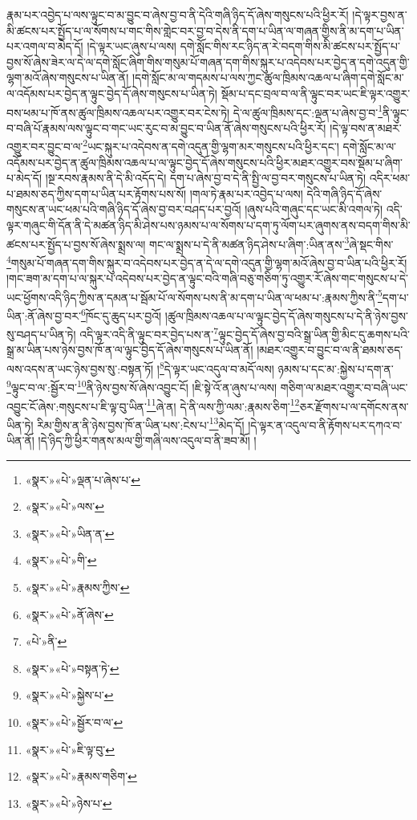 རྣམ་པར་འབྱེད་པ་ལས་ལྟུང་བ་མ་བྱུང་བ་ཞེས་བྱ་བ་ནི་དེའི་གཞི་ཉིད་དོ་ཞེས་གསུངས་པའི་ཕྱིར་རོ། །དེ་ལྟར་བྱས་ན་མི་ཚངས་པར་སྤྱོད་པ་ལ་སོགས་པ་གང་གིས་གླེང་བར་བྱ་བ་དེས་ནི་དག་པ་ཡིན་ལ་གཞན་གྱིས་ནི་མ་དག་པ་ཡིན་པར་འགལ་བ་མེད་དོ། །དེ་ལྟར་ཡང་ཞུས་པ་ལས། དགེ་སློང་གིས་རང་ཉིད་ན་རེ་བདག་གིས་མི་ཚངས་པར་སྤྱོད་པ་བྱས་སོ་ཞེས་ཟེར་ལ་དེ་ལ་དགེ་སློང་ཞིག་གིས་གསུམ་པོ་གཞན་དག་གིས་སྐུར་པ་འདེབས་པར་བྱེད་ན་དགེ་འདུན་གྱི་ལྷག་མའོ་ཞེས་གསུངས་པ་ཡིན་ནོ། །དགེ་སློང་མ་ལ་གདམས་པ་ལས་ཀྱང་ཚུལ་ཁྲིམས་འཆལ་པ་ཞིག་དགེ་སློང་མ་ལ་འདོམས་པར་བྱེད་ན་ལྟུང་བྱེད་དོ་ཞེས་གསུངས་པ་ཡིན་ཏེ། སྡོམ་པ་དང་བྲལ་བ་ལ་ནི་ལྟུང་བར་ཡང་ཇི་ལྟར་འགྱུར་བས་ཕམ་པ་ཁོ་ནས་ཚུལ་ཁྲིམས་འཆལ་པར་འགྱུར་བར་ངེས་ཏེ། དེ་ལ་ཚུལ་ཁྲིམས་དང་:ལྡན་པ་ཞེས་བྱ་བ་\footnote{«སྣར་»«པེ་»ལྡན་པ་ཞེས་པ་}ནི་ལྟུང་བ་བཞི་པོ་རྣམས་ལས་ལྟུང་བ་གང་ཡང་རུང་བ་མ་བྱུང་བ་ཡིན་ནོ་ཞེས་གསུངས་པའི་ཕྱིར་རོ། །དེ་ལྟ་བས་ན་མཐར་འགྱུར་བར་བྱུང་བ་ལ་\footnote{«སྣར་»«པེ་»ལས་}ཡང་སྐུར་པ་འདེབས་ན་དགེ་འདུན་གྱི་ལྷག་མར་གསུངས་པའི་ཕྱིར་དང་། དགེ་སློང་མ་ལ་འདོམས་པར་བྱེད་ན་ཚུལ་ཁྲིམས་འཆལ་པ་ལ་ལྟུང་བྱེད་དོ་ཞེས་གསུངས་པའི་ཕྱིར་མཐར་འགྱུར་བས་སྡོམ་པ་ཞིག་པ་མེད་དོ། །སྔ་རབས་རྣམས་ནི་དེ་མི་འདོད་དེ། དག་པ་ཞེས་བྱ་བ་དེ་ནི་སྤྱི་ལ་བྱ་བར་གསུངས་པ་ཡིན་ཏེ། འདིར་ཕམ་པ་ཐམས་ཅད་ཀྱིས་དག་པ་ཡིན་པར་རྟོགས་པས་སོ། །གལ་ཏེ་རྣམ་པར་འབྱེད་པ་ལས། དེའི་གཞི་ཉིད་དོ་ཞེས་གསུངས་ན་ཡང་ཕམ་པའི་གཞི་ཉིད་དོ་ཞེས་བྱ་བར་བཤད་པར་བྱའོ། །ཞུས་པའི་གཞུང་དང་ཡང་མི་འགལ་ཏེ། འདི་ལྟར་གཞུང་གི་དོན་ནི་དེ་མཚན་ཉིད་མི་ཤེས་པས་ཉམས་པ་ལ་སོགས་པ་དག་ཏུ་ལོག་པར་ཞུགས་ནས་བདག་གིས་མི་ཚངས་པར་སྤྱོད་པ་བྱས་སོ་ཞེས་སྨྲས་ལ། གང་ལ་སྨྲས་པ་དེ་ནི་མཚན་ཉིད་ཤེས་པ་ཞིག་:ཡིན་ནས་\footnote{«སྣར་»«པེ་»ཡིན་ན་}ཞེ་སྡང་གིས་\footnote{«སྣར་»«པེ་»གི་}གསུམ་པོ་གཞན་དག་གིས་སྐུར་བ་འདེབས་པར་བྱེད་ན་དེ་ལ་དགེ་འདུན་གྱི་ལྷག་མའོ་ཞེས་བྱ་བ་ཡིན་པའི་ཕྱིར་རོ། །གང་ཟག་མ་དག་པ་ལ་སྐུར་པ་འདེབས་པར་བྱེད་ན་ལྟུང་བའི་གཞི་བཅུ་གཅིག་ཏུ་འགྱུར་རོ་ཞེས་གང་གསུངས་པ་དེ་ཡང་ཕྱོགས་འདི་ཉིད་ཀྱིས་ན་དམན་པ་སྦོམ་པོ་ལ་སོགས་པས་ནི་མ་དག་པ་ཡིན་ལ་ཕམ་པ་:རྣམས་ཀྱིས་ནི་\footnote{«སྣར་»«པེ་»རྣམས་ཀྱིས་}དག་པ་ཡིན་:ནོ་ཞེས་བྱ་བར་\footnote{«སྣར་»«པེ་»ནོ་ཞེས་}ཁོང་དུ་ཆུད་པར་བྱའོ། །ཚུལ་ཁྲིམས་འཆལ་པ་ལ་ལྟུང་བྱེད་དོ་ཞེས་གསུངས་པ་དེ་ནི་ཉེས་བྱས་སུ་བཤད་པ་ཡིན་ཏེ། འདི་ལྟར་འདི་ནི་ལྟུང་བར་བྱེད་པས་ན་\footnote{«པེ་»ནི་}ལྟུང་བྱེད་དོ་ཞེས་བྱ་བའི་སྒྲ་ཡིན་གྱི་མིང་དུ་ཆགས་པའི་སྒྲ་མ་ཡིན་པས་ཉེས་བྱས་ཁོ་ན་ལ་ལྟུང་བྱེད་དོ་ཞེས་གསུངས་པ་ཡིན་ནོ། །མཐར་འགྱུར་བ་བྱུང་བ་ལ་ནི་ཐམས་ཅད་ལས་འདས་ན་ཡང་ཉེས་བྱས་སུ་:བསྟན་ཏོ། །\footnote{«སྣར་»«པེ་»བསྟན་ཏེ་}དེ་ལྟར་ཡང་འདུལ་བ་མདོ་ལས། ཉམས་པ་དང་མ་:སྐྱེས་པ་དག་ན་\footnote{«སྣར་»«པེ་»སྐྱེས་པ་}ལྟུང་བ་ལ་:སྦྱོར་བ་\footnote{«སྣར་»«པེ་»སྦྱོར་བ་ལ་}ནི་ཉེས་བྱས་སོ་ཞེས་འབྱུང་ངོ། །ཇི་སྟེ་འོ་ན་ཞུས་པ་ལས། གཅིག་ལ་མཐར་འགྱུར་བ་བཞི་ཡང་འབྱུང་ངོ་ཞེས་:གསུངས་པ་ཇི་ལྟ་བུ་ཡིན་\footnote{«སྣར་»«པེ་»ཇི་ལྟ་བུ་}ཞེ་ན། དེ་ནི་ལས་ཀྱི་ལམ་:རྣམས་ཅིག་\footnote{«སྣར་»«པེ་»རྣམས་གཅིག་}ཅར་རྫོགས་པ་ལ་དགོངས་ནས་ཡིན་ཏེ། རིམ་གྱིས་ན་ནི་ཉེས་བྱས་ཁོ་ན་ཡིན་པས་:ངེས་པ་\footnote{«སྣར་»«པེ་»ཉེས་པ་}མེད་དོ། །དེ་ལྟར་ན་འདུལ་བ་ནི་རྟོགས་པར་དཀའ་བ་ཡིན་ནོ། །དེ་ཉིད་ཀྱི་ཕྱིར་གནས་མལ་གྱི་གཞི་ལས་འདུལ་བ་ནི་ཟབ་མོ། །
